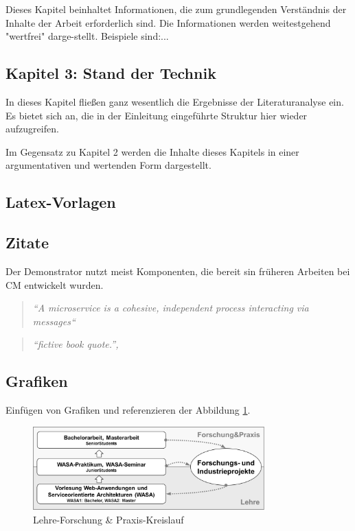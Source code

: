 Dieses Kapitel beinhaltet Informationen, die zum grundlegenden Verständnis der Inhalte der Arbeit erforderlich sind. Die Informationen werden weitestgehend "wertfrei" darge-stellt. Beispiele sind:...

\subsection*{Kapitel 3: Stand der Technik}

In dieses Kapitel fließen ganz wesentlich die Ergebnisse der Literaturanalyse ein. Es bietet sich an, die in der Einleitung eingeführte Struktur hier wieder aufzugreifen.

Im Gegensatz zu Kapitel 2 werden die Inhalte dieses Kapitels in einer argumentativen und wertenden Form dargestellt.

\iffalse
\subsection{Latex-Vorlagen}

\subsection{Zitate}
\label{subsec:zitate}
Der Demonstrator nutzt meist Komponenten, die bereit sin früheren Arbeiten bei \gls{CM} entwickelt wurden.
\begin{quote}
\textit{``A microservice is a cohesive, independent process interacting via messages``}
\end{quote}
\begin{quote}
\textit{``fictive book quote.'', \cite[S.~99]{Be02}}
\end{quote}

\subsection{Grafiken}
Einfügen von Grafiken und referenzieren der Abbildung \ref{fig:lehre}.
\begin{figure}[h]
	\centering
	\includegraphics[width=0.8\textwidth]{images/lehre_kreislauf.png}
	\caption{Lehre-Forschung \& Praxis-Kreislauf}
	\label{fig:lehre}
\end{figure}


